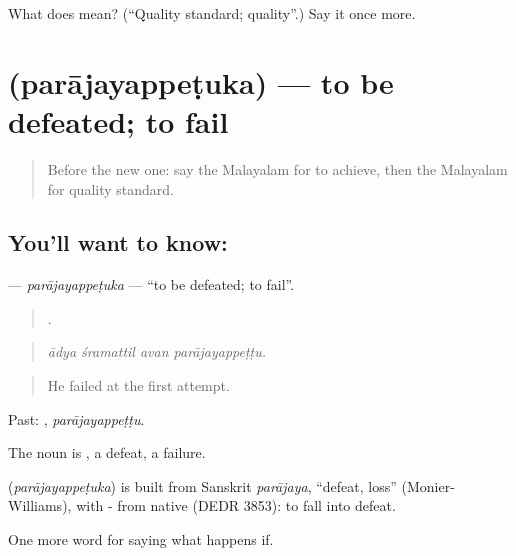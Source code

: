 \begin{tcolorbox}[breakable,colback=teal!4,colframe=teal!35!black,title={Before you move on}]
What does  mean? (\textquotedblleft{}Quality standard; quality\textquotedblright{}.) Say it once more.
\end{tcolorbox}
\section[\texorpdfstring{\ml{പരാജയപ്പെടുക} (parājayappeṭuka)}{പരാജയപ്പെടുക (parājayappeṭuka)}]{ (parājayappeṭuka) — to be defeated; to fail}

\label{lesson:ML-C447-parajayappetuka}



\begin{quote}
Before the new one: say the Malayalam for to achieve, then the Malayalam for quality standard.
\end{quote}

\subsection*{You'll want to know: }
\textbf{} — \emph{parājayappeṭuka} — \textquotedblleft{}to be defeated; to fail\textquotedblright{}.

\begin{quote}
   .
\end{quote}

\begin{quote}
\emph{ādya śramattil avan parājayappeṭṭu.}
\end{quote}

\begin{quote}
He failed at the first attempt.
\end{quote}

Past: , \emph{parājayappeṭṭu}.

The noun is , a defeat, a failure.

\begin{cousinweb}
\textbf{} (\emph{parājayappeṭuka}) is built from Sanskrit \emph{parājaya}, \textquotedblleft{}defeat, loss\textquotedblright{} (Monier-Williams), with - from native  (DEDR 3853): to fall into defeat.
\end{cousinweb}

\begin{grammarlens}[title={What you've built}]
One more word for saying what happens if.
\end{grammarlens}

